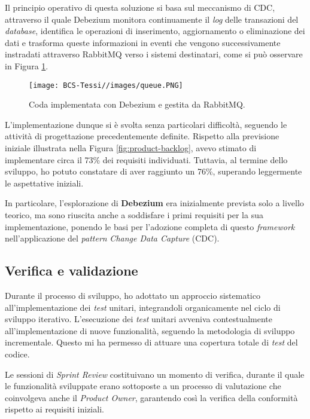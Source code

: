         \vspace{0.2 em}
        \noindent Il principio operativo di questa soluzione si basa sul meccanismo di CDC, attraverso il quale Debezium monitora continuamente il \textit{log} delle transazioni del \textit{database}, identifica le operazioni di inserimento, aggiornamento o eliminazione dei dati e trasforma queste informazioni in eventi che vengono successivamente instradati attraverso RabbitMQ verso i sistemi destinatari, come si può osservare in Figura \ref{fig:queue}.

        \begin{figure}[H]
            \centering
            \texttt{[image: BCS-Tessi//images/queue.PNG]}
            \caption{Coda implementata con Debezium e gestita da RabbitMQ.}
            \label{fig:queue}
        \end{figure}

        \noindent L'implementazione dunque si è svolta senza particolari difficoltà, seguendo le attività di progettazione precedentemente definite. Rispetto alla previsione iniziale illustrata nella Figura \ref{fig:product-backlog}, avevo stimato di implementare circa il 73\% dei requisiti individuati. Tuttavia, al termine dello sviluppo, ho potuto constatare di aver raggiunto un 76\%, superando leggermente le aspettative iniziali.  

        In particolare, l'esplorazione di \textbf{Debezium} era inizialmente prevista solo a livello teorico, ma sono riuscita anche a soddisfare i primi requisiti per la sua implementazione, ponendo le basi per l'adozione completa di questo \textit{framework} nell'applicazione del \textit{pattern} \textit{Change Data Capture} (CDC). 

        
        \subsection{Verifica e validazione}
        Durante il processo di sviluppo, ho adottato un approccio sistematico all'implementazione dei \textit{test} unitari, integrandoli organicamente nel ciclo di sviluppo iterativo. L'esecuzione dei \textit{test} unitari avveniva contestualmente all'implementazione di nuove funzionalità, seguendo la metodologia di sviluppo incrementale. Questo mi ha permesso di attuare una copertura totale di \textit{test} del codice.

        \vspace{0.2 em}
        \noindent Le sessioni di \textit{Sprint Review} costituivano un momento di verifica, durante il quale le funzionalità sviluppate erano sottoposte a un processo di valutazione che coinvolgeva anche il \textit{Product Owner}, garantendo così la verifica della conformità rispetto ai requisiti iniziali.

